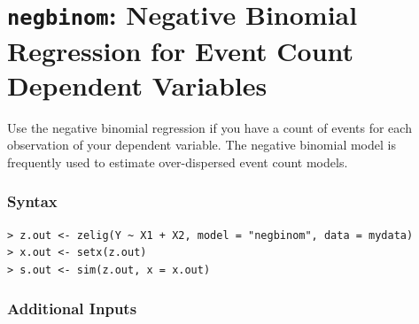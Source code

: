 \documentclass{article}
\begin{document}
\nobibliography*



\section{{\tt negbinom}: Negative Binomial Regression for Event
Count Dependent Variables}\label{negbinom}

Use the negative binomial regression if you have a count of events for
each observation of your dependent variable.  The negative binomial
model is frequently used to estimate over-dispersed event count
models.

\subsubsection{Syntax}

\begin{verbatim}
> z.out <- zelig(Y ~ X1 + X2, model = "negbinom", data = mydata)
> x.out <- setx(z.out)
> s.out <- sim(z.out, x = x.out)
\end{verbatim}

\subsubsection{Additional Inputs} 
\end{document}
